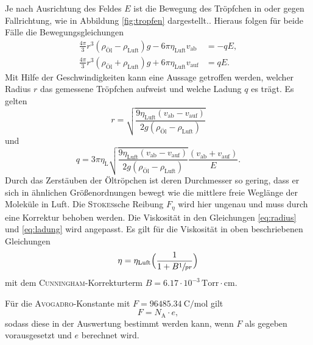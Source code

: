Je nach Ausrichtung des Feldes $E$ ist die Bewegung des Tröpfchen in oder gegen Fallrichtung, wie in Abbildung \ref{fig:tropfen} dargestellt..
Hieraus folgen für beide Fälle die Bewegungsgleichungen
\begin{align}
	\frac{4\pi}{3}r^3(\rho_\text{Öl}-\rho_\text{Luft})g-6\pi\eta_\text{Luft}v_\text{ab} &= -q E,\\
	\frac{4\pi}{3}r^3(\rho_\text{Öl}+\rho_\text{Luft})g+6\pi\eta_\text{Luft}v_\text{auf}&= q E.
	\label{eq:bewgl_2}
\end{align}
Mit Hilfe der Geschwindigkeiten kann eine Aussage getroffen werden,
welcher Radius $r$ das gemessene Tröpfchen aufweist und welche Ladung $q$ es trägt.
Es gelten
\begin{equation}
	r=\sqrt{\frac{9\eta_\text{Luft}(v_\text{ab}-v_\text{auf})}{2g(\rho_\text{Öl}-\rho_\text{Luft})}}
	\label{eq:radius}
\end{equation}
und
\begin{equation}
	q=3\pi\eta_\text{L}\sqrt{\frac{9\eta_\text{Luft}(v_\text{ab}-v_\text{auf})}{2g(\rho_\text{Öl}-\rho_\text{Luft})}}\frac{(v_\text{ab}+v_\text{auf})}{E}.
	\label{eq:ladung}
\end{equation}
Durch das Zerstäuben der Öltröpchen ist deren Durchmesser so gering, dass er sich in ähnlichen Größenordnungen bewegt wie die mittlere freie Weglänge der Moleküle in Luft. Die \textsc{Stokes}sche Reibung  $F_{\eta}$ wird hier ungenau und muss durch eine Korrektur behoben werden. Die Viskosität in den Gleichungen \eqref{eq:radius} und \eqref{eq:ladung} wird angepasst. 
Es gilt für die Viskosität in oben beschriebenen Gleichungen
\begin{equation}
	\eta= \eta_\text{Luft}\Bigl(\frac{1}{1+B\sfrac{1}{p r}}\Bigr)
	\label{eq:cunningham}
\end{equation}
mit dem \textsc{Cunningham}-Korrekturterm $B=6.17\cdot 10^{-3}\,\text{Torr}\cdot\text{cm}$.

Für die \textsc{Avogadro}-Konstante mit $F=\SI{96485.34}{\coulomb\per\mol}$ gilt
\begin{equation}
	F=N_\text{A}\cdot e,
\label{eq:av}
\end{equation}
sodass diese in der Auswertung bestimmt werden kann, wenn $F$ als gegeben vorausgesetzt und $e$ berechnet wird.
